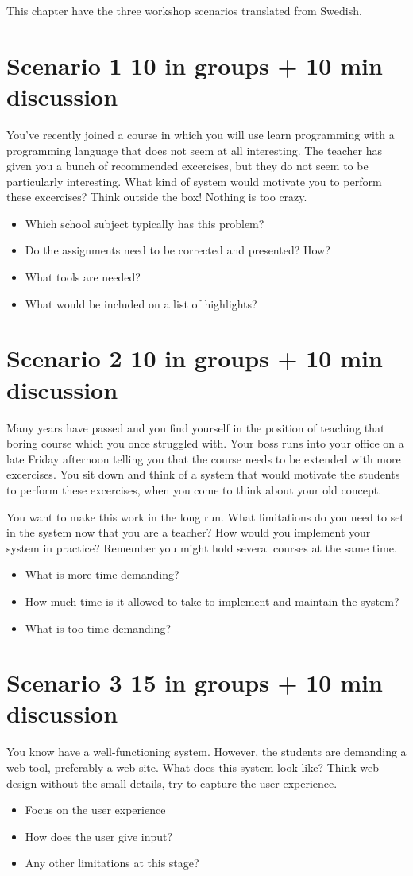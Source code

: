 This chapter have the three workshop scenarios translated from Swedish.

\section{Scenario 1 10 in groups + 10 min discussion}
You've recently joined a course in which you will use learn programming with a programming language that does not seem at all interesting. The teacher has given you a bunch of recommended excercises, but they do not seem to be particularly interesting. What kind of system would motivate you to perform these excercises? Think outside the box! Nothing is too crazy.

\begin{itemize}
\item Which school subject typically has this problem?
\item Do the assignments need to be corrected and presented? How?
\item What tools are needed?
\item What would be included on a list of highlights?
\end{itemize}

\section{Scenario 2 10 in groups + 10 min discussion}
Many years have passed and you find yourself in the position of teaching that boring course which you once struggled with. Your boss runs into your office on a late Friday afternoon telling you that the course needs to be extended with more excercises. You sit down and think of a system that would motivate the students to perform these excercises, when you come to think about your old concept.

You want to make this work in the long run. What limitations do you need to set in the system now that you are a teacher? How would you implement your system in practice? Remember you might hold several courses at the same time.

\begin{itemize}
\item What is more time-demanding?
\item How much time is it allowed to take to implement and maintain the system?
\item What is too time-demanding?
\end{itemize}

\section{Scenario 3 15 in groups + 10 min discussion}
You know have a well-functioning system. However, the students are demanding a web-tool, preferably a web-site. What does this system look like? Think web-design without the small details, try to capture the user experience.

\begin{itemize}
\item Focus on the user experience
\item How does the user give input?
\item Any other limitations at this stage?
\end{itemize}
